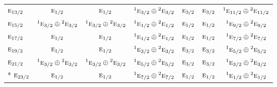 \documentclass[10pt,a4paper]{article}
\numberwithin{equation}{section}
\newcommand{\irr}[1]{\text{\normalfont\scshape #1}}
\newcommand{\conjpair}[1]{{}^{#1}}
\begin{document}
{\begin{longtable}{@{}lcccccc@{}}
$\irr{e}_{13/2}$ & $\irr{e}_{1/2}$ & $\irr{e}_{1/2}$ & $\conjpair{1}\irr{e}_{3/2}\oplus \conjpair{2}\irr{e}_{3/2}$ & $\irr{e}_{3/2}$ & $\irr{e}_{3/2}$ & $\conjpair{1}\irr{e}_{11/2}\oplus \conjpair{2}\irr{e}_{11/2}$\\
$\irr{e}_{15/2}$ & $\conjpair{1}\irr{e}_{3/2}\oplus \conjpair{2}\irr{e}_{3/2}$ & $\conjpair{1}\irr{e}_{3/2}\oplus \conjpair{2}\irr{e}_{3/2}$ & $\conjpair{1}\irr{e}_{1/2}\oplus \conjpair{2}\irr{e}_{1/2}$ & $\irr{e}_{1/2}$ & $\irr{e}_{1/2}$ & $\conjpair{1}\irr{e}_{9/2}\oplus \conjpair{2}\irr{e}_{9/2}$\\
$\irr{e}_{17/2}$ & $\irr{e}_{1/2}$ & $\irr{e}_{1/2}$ & $\conjpair{1}\irr{e}_{1/2}\oplus \conjpair{2}\irr{e}_{1/2}$ & $\irr{e}_{1/2}$ & $\irr{e}_{1/2}$ & $\conjpair{1}\irr{e}_{7/2}\oplus \conjpair{2}\irr{e}_{7/2}$\\
$\irr{e}_{19/2}$ & $\irr{e}_{1/2}$ & $\irr{e}_{1/2}$ & $\conjpair{1}\irr{e}_{3/2}\oplus \conjpair{2}\irr{e}_{3/2}$ & $\irr{e}_{3/2}$ & $\irr{e}_{3/2}$ & $\conjpair{1}\irr{e}_{5/2}\oplus \conjpair{2}\irr{e}_{5/2}$\\
$\irr{e}_{21/2}$ & $\conjpair{1}\irr{e}_{3/2}\oplus \conjpair{2}\irr{e}_{3/2}$ & $\conjpair{1}\irr{e}_{3/2}\oplus \conjpair{2}\irr{e}_{3/2}$ & $\conjpair{1}\irr{e}_{5/2}\oplus \conjpair{2}\irr{e}_{5/2}$ & $\irr{e}_{3/2}$ & $\irr{e}_{3/2}$ & $\conjpair{1}\irr{e}_{3/2}\oplus \conjpair{2}\irr{e}_{3/2}$\\*
$\irr{e}_{23/2}$ & $\irr{e}_{1/2}$ & $\irr{e}_{1/2}$ & $\conjpair{1}\irr{e}_{7/2}\oplus \conjpair{2}\irr{e}_{7/2}$ & $\irr{e}_{1/2}$ & $\irr{e}_{1/2}$ & $\conjpair{1}\irr{e}_{1/2}\oplus \conjpair{2}\irr{e}_{1/2}$\\
\bottomrule\end{longtable}}
\end{document}
